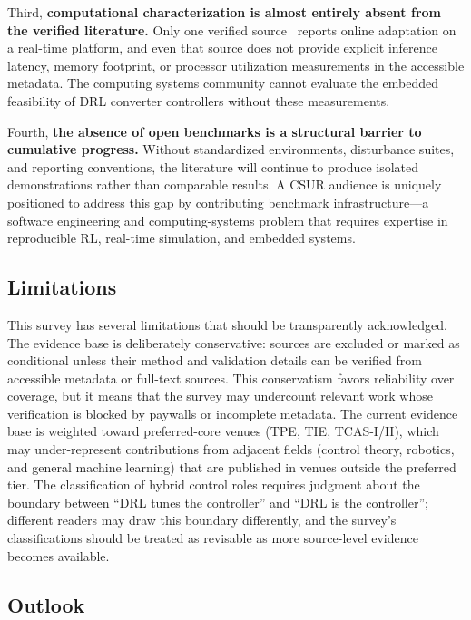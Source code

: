 \documentclass[manuscript,screen,review]{acmart}
\begin{document}
Third, \textbf{computational characterization is almost entirely absent from the verified literature.}
Only one verified source~\cite{hajihosseini2020dc} reports online adaptation on a real-time platform, and even that source does not provide explicit inference latency, memory footprint, or processor utilization measurements in the accessible metadata.
The computing systems community cannot evaluate the embedded feasibility of DRL converter controllers without these measurements.

Fourth, \textbf{the absence of open benchmarks is a structural barrier to cumulative progress.}
Without standardized environments, disturbance suites, and reporting conventions, the literature will continue to produce isolated demonstrations rather than comparable results.
A CSUR audience is uniquely positioned to address this gap by contributing benchmark infrastructure---a software engineering and computing-systems problem that requires expertise in reproducible RL, real-time simulation, and embedded systems.

\subsection{Limitations}

This survey has several limitations that should be transparently acknowledged.
The evidence base is deliberately conservative: sources are excluded or marked as conditional unless their method and validation details can be verified from accessible metadata or full-text sources.
This conservatism favors reliability over coverage, but it means that the survey may undercount relevant work whose verification is blocked by paywalls or incomplete metadata.
The current evidence base is weighted toward preferred-core venues (TPE, TIE, TCAS-I/II), which may under-represent contributions from adjacent fields (control theory, robotics, and general machine learning) that are published in venues outside the preferred tier.
The classification of hybrid control roles requires judgment about the boundary between ``DRL tunes the controller'' and ``DRL is the controller''; different readers may draw this boundary differently, and the survey's classifications should be treated as revisable as more source-level evidence becomes available.

\subsection{Outlook}
\end{document}
